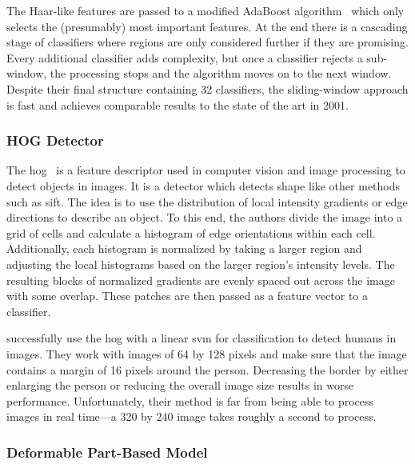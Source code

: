 \documentclass[draft,final]{vutinfth} %
\begin{document}
The Haar-like features are passed to a modified AdaBoost
algorithm~\cite{freund1995} which only selects the (presumably) most
important features. At the end there is a cascading stage of
classifiers where regions are only considered further if they are
promising. Every additional classifier adds complexity, but once a
classifier rejects a sub-window, the processing stops and the
algorithm moves on to the next window. Despite their final structure
containing 32 classifiers, the sliding-window approach is fast and
achieves comparable results to the state of the art in 2001.

\subsubsection{HOG Detector}
\label{sssec:obj-hog}

The \gls{hog}~\cite{dalal2005} is a feature descriptor used in
computer vision and image processing to detect objects in images. It
is a detector which detects shape like other methods such as
\gls{sift}. The idea is to use the distribution of local intensity
gradients or edge directions to describe an object. To this end, the
authors divide the image into a grid of cells and calculate a
histogram of edge orientations within each cell. Additionally, each
histogram is normalized by taking a larger region and adjusting the
local histograms based on the larger region's intensity levels. The
resulting blocks of normalized gradients are evenly spaced out across
the image with some overlap. These patches are then passed as a
feature vector to a classifier.

\textcite{dalal2005} successfully use the \gls{hog} with a linear
\gls{svm} for classification to detect humans in images. They work
with images of 64 by 128 pixels and make sure that the image contains
a margin of 16 pixels around the person. Decreasing the border by
either enlarging the person or reducing the overall image size results
in worse performance. Unfortunately, their method is far from being
able to process images in real time—a 320 by 240 image takes roughly a
second to process.

\subsubsection{Deformable Part-Based Model}
\label{sssec:obj-dpm}
\end{document}
